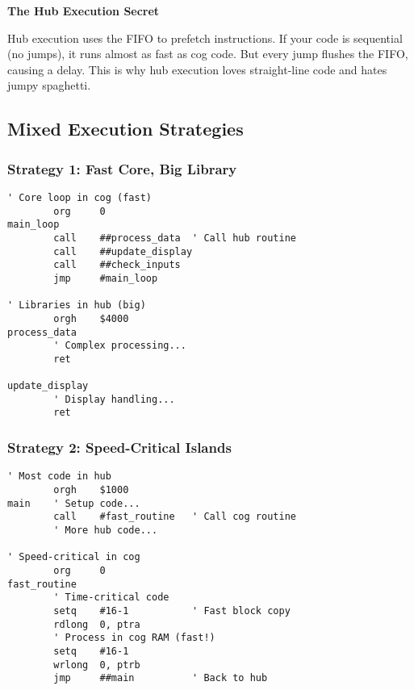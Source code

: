\documentclass[11pt]{book}
\begin{document}
\begin{sidetrack}
\textbf{The Hub Execution Secret}

Hub execution uses the FIFO to prefetch instructions. If your code is sequential (no jumps), it runs almost as fast as cog code. But every jump flushes the FIFO, causing a delay. This is why hub execution loves straight-line code and hates jumpy spaghetti.
\end{sidetrack}

\hypertarget{mixed-execution-strategies}{%
\subsection{Mixed Execution
Strategies}\label{mixed-execution-strategies}}

\hypertarget{strategy-1-fast-core-big-library}{%
\subsubsection{Strategy 1: Fast Core, Big
Library}\label{strategy-1-fast-core-big-library}}

\begin{lstlisting}
' Core loop in cog (fast)
        org     0
main_loop
        call    ##process_data  ' Call hub routine
        call    ##update_display
        call    ##check_inputs
        jmp     #main_loop
        
' Libraries in hub (big)
        orgh    $4000
process_data
        ' Complex processing...
        ret
        
update_display
        ' Display handling...
        ret
\end{lstlisting}

\hypertarget{strategy-2-speed-critical-islands}{%
\subsubsection{Strategy 2: Speed-Critical
Islands}\label{strategy-2-speed-critical-islands}}

\begin{lstlisting}
' Most code in hub
        orgh    $1000
main    ' Setup code...
        call    #fast_routine   ' Call cog routine
        ' More hub code...
        
' Speed-critical in cog
        org     0
fast_routine
        ' Time-critical code
        setq    #16-1           ' Fast block copy
        rdlong  0, ptra
        ' Process in cog RAM (fast!)
        setq    #16-1
        wrlong  0, ptrb
        jmp     ##main          ' Back to hub
\end{lstlisting}
\end{document}

